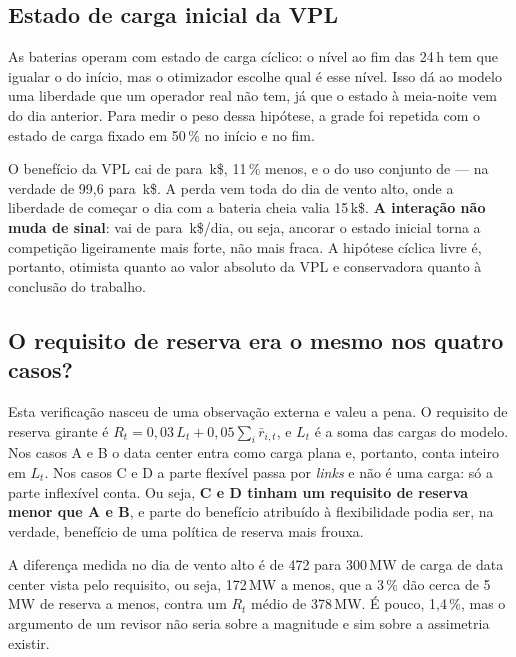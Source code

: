 \documentclass[11pt,a4paper]{article}
\begin{document}
\subsection{Estado de carga inicial da VPL}

As baterias operam com estado de carga cíclico: o nível ao fim das 24\,h tem que igualar o do início,
mas o otimizador escolhe qual é esse nível. Isso dá ao modelo uma liberdade que um operador real não
tem, já que o estado à meia-noite vem do dia anterior. Para medir o peso dessa hipótese, a grade foi
repetida com o estado de carga fixado em 50\,\% no início e no fim.

\begin{table}[htbp]
\centering\small
\caption{Estado de carga cíclico livre contra ancorado em 50\,\% (k\$/dia).}
\tabsoc
\end{table}

O benefício da VPL cai de \numparpar{} para \numsocdB{}\,k\$, 11\,\% menos, e o do uso conjunto de
\numcustoA{} --- na verdade de 99{,}6 para \numsocdD{}\,k\$. A perda vem toda do dia de vento alto, onde
a liberdade de começar o dia com a bateria cheia valia 15\,k\$. \textbf{A interação não muda de sinal}:
vai de \numIbase{} para \numsocI{}\,k\$/dia, ou seja, ancorar o estado inicial torna a competição
ligeiramente mais forte, não mais fraca. A hipótese cíclica livre é, portanto, otimista quanto ao valor
absoluto da VPL e conservadora quanto à conclusão do trabalho.

\subsection{O requisito de reserva era o mesmo nos quatro casos?}

Esta verificação nasceu de uma observação externa e valeu a pena. O requisito de reserva girante é
$R_t = 0{,}03\,L_t + 0{,}05\sum_i \bar r_{i,t}$, e $L_t$ é a soma das cargas do modelo. Nos casos A e B o
data center entra como carga plana e, portanto, conta inteiro em $L_t$. Nos casos C e D a parte flexível
passa por \emph{links} e não é uma carga: só a parte inflexível conta. Ou seja, \textbf{C e D tinham um
requisito de reserva menor que A e B}, e parte do benefício atribuído à flexibilidade podia ser, na
verdade, benefício de uma política de reserva mais frouxa.

A diferença medida no dia de vento alto é de 472 para 300\,MW de carga de data center vista pelo
requisito, ou seja, 172\,MW a menos, que a 3\,\% dão cerca de 5\,MW de reserva a menos, contra um $R_t$
médio de 378\,MW. É pouco, 1{,}4\,\%, mas o argumento de um revisor não seria sobre a magnitude e sim
sobre a assimetria existir.
\end{document}
